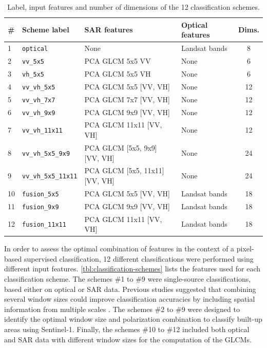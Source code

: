 \documentclass[remotesensing,article,submit,moreauthors,pdftex,10pt,a4paper]{Definitions/mdpi}
\begin{document}
\begin{table}[H]
    \caption{Label, input features and number of dimensions of the 12
    classification schemes.}
    \centering
    \label{tbl:classification-schemes}
    \begin{tabular}{llllc}
        \toprule
        \# & \textbf{Scheme label} & \textbf{SAR features} & \textbf{Optical features} & \textbf{Dims.} \\
        \midrule
        1 & \texttt{optical} & None & Landsat bands & 8 \\
        2 & \texttt{vv\_5x5} & PCA GLCM 5x5 VV & None & 6 \\
        3 & \texttt{vh\_5x5} & PCA GLCM 5x5 VH & None & 6 \\
        4 & \texttt{vv\_vh\_5x5} & PCA GLCM 5x5 {[}VV, VH{]} & None & 12 \\
        5 & \texttt{vv\_vh\_7x7} & PCA GLCM 7x7 {[}VV, VH{]} & None & 12 \\
        6 & \texttt{vv\_vh\_9x9} & PCA GLCM 9x9 {[}VV, VH{]} & None & 12 \\
        7 & \texttt{vv\_vh\_11x11} & PCA GLCM 11x11 {[}VV, VH{]} & None & 12 \\
        8 & \texttt{vv\_vh\_5x5\_9x9} & PCA GLCM {[}5x5, 9x9{]} {[}VV, VH{]} & None & 24 \\
        9 & \texttt{vv\_vh\_5x5\_11x11} & PCA GLCM {[}5x5, 11x11{]} {[}VV, VH{]} & None & 24 \\
        10 & \texttt{fusion\_5x5} & PCA GLCM 5x5 {[}VV, VH{]} & Landsat bands & 18 \\
        11 & \texttt{fusion\_9x9} & PCA GLCM 9x9 {[}VV, VH{]} & Landsat bands & 18 \\
        12 & \texttt{fusion\_11x11} & PCA GLCM 11x11 {[}VV, VH{]} & Landsat bands & 18 \\
        \bottomrule
    \end{tabular}
\end{table}

In order to assess the optimal combination of features in the context of a
pixel-based supervised classification, 12 different classifications were
performed using different input features. \autoref{tbl:classification-schemes}
lists the features used for each classification scheme. The schemes \#1 to \#9
were single-source classifications, based either on optical or SAR data.
Previous studies suggested that combining several window sizes could improve
classification accuracies by including spatial information from multiple scales
\cite{Puissant2005}. The schemes \#2 to \#9 were designed to identify the
optimal window size and polarization combination to classify built-up areas
using Sentinel-1. Finally, the schemes \#10 to \#12 included both optical and
SAR data with different window sizes for the computation of the GLCMs.
\end{document}
